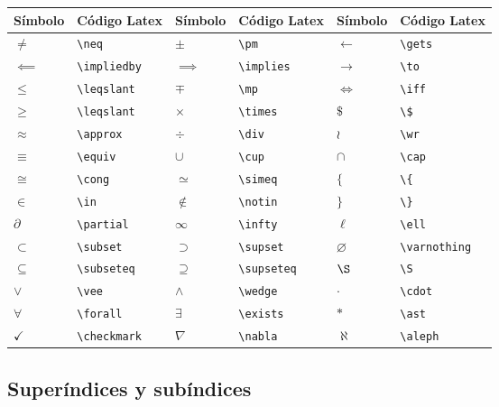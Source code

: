 \documentclass[11pt]{article}
\begin{document}
\begin{longtable}[c]{@{}llllll@{}}
\toprule
Símbolo & Código Latex & Símbolo & Código Latex & Símbolo & Código
Latex\tabularnewline
\midrule
\endhead
\(\neq\) & \texttt{\textbackslash{}neq} & \(\pm\) &
\texttt{\textbackslash{}pm} & \(\gets\) &
\texttt{\textbackslash{}gets}\tabularnewline
\(\impliedby\) & \texttt{\textbackslash{}impliedby} & \(\implies\) &
\texttt{\textbackslash{}implies} & \(\to\) &
\texttt{\textbackslash{}to}\tabularnewline
\(\leqslant\) & \texttt{\textbackslash{}leqslant} & \(\mp\) &
\texttt{\textbackslash{}mp} & \(\iff\) &
\texttt{\textbackslash{}iff}\tabularnewline
\(\geqslant\) & \texttt{\textbackslash{}leqslant} & \(\times\) &
\texttt{\textbackslash{}times} & \(\$\) &
\texttt{\textbackslash{}\$}\tabularnewline
\(\approx\) & \texttt{\textbackslash{}approx} & \(\div\) &
\texttt{\textbackslash{}div} & \(\wr\) &
\texttt{\textbackslash{}wr}\tabularnewline
\(\equiv\) & \texttt{\textbackslash{}equiv} & \(\cup\) &
\texttt{\textbackslash{}cup} & \(\cap\) &
\texttt{\textbackslash{}cap}\tabularnewline
\(\cong\) & \texttt{\textbackslash{}cong} & \(\simeq\) &
\texttt{\textbackslash{}simeq} & \(\{\) &
\texttt{\textbackslash{}\{}\tabularnewline
\(\in\) & \texttt{\textbackslash{}in} & \(\notin\) &
\texttt{\textbackslash{}notin} & \(\}\) &
\texttt{\textbackslash{}\}}\tabularnewline
\(\partial\) & \texttt{\textbackslash{}partial} & \(\infty\) &
\texttt{\textbackslash{}infty} & \(\ell\) &
\texttt{\textbackslash{}ell}\tabularnewline
\(\subset\) & \texttt{\textbackslash{}subset} & \(\supset\) &
\texttt{\textbackslash{}supset} & \(\varnothing\) &
\texttt{\textbackslash{}varnothing}\tabularnewline
\(\subseteq\) & \texttt{\textbackslash{}subseteq} & \(\supseteq\) &
\texttt{\textbackslash{}supseteq} & \(\S\) &
\texttt{\textbackslash{}S}\tabularnewline
\(\vee\) & \texttt{\textbackslash{}vee} & \(\wedge\) &
\texttt{\textbackslash{}wedge} & \(\cdot\) &
\texttt{\textbackslash{}cdot}\tabularnewline
\(\forall\) & \texttt{\textbackslash{}forall} & \(\exists\) &
\texttt{\textbackslash{}exists} & \(\ast\) &
\texttt{\textbackslash{}ast}\tabularnewline
\(\checkmark\) & \texttt{\textbackslash{}checkmark} & \(\nabla\) &
\texttt{\textbackslash{}nabla} & \(\aleph\) &
\texttt{\textbackslash{}aleph}\tabularnewline
\bottomrule
\end{longtable}

    \subsection{Superíndices y
subíndices}\label{superuxedndices-y-subuxedndices}
\end{document}
